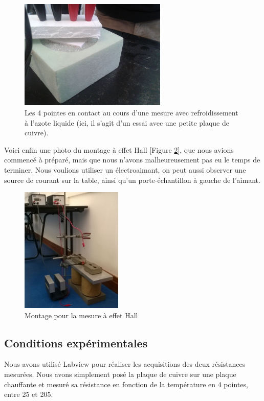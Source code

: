 \begin{figure}
  \begin{center}
		\includegraphics[width=7cm]{./images/photo5.jpg}
		\caption{Les 4 pointes en contact au cours d'une mesure avec refroidissement à l'azote liquide (ici, il s'agit d'un essai avec une petite plaque de cuivre).}
		\label{photo5}
	\end{center}
\end{figure}

Voici enfin une photo du montage à effet Hall [Figure \ref{photo_hall}], que nous avions commencé à préparé, 
mais que nous n'avons malheureusement pas eu le temps de terminer. Nous voulions utiliser un électroaimant, 
on peut aussi observer une source de courant sur la table, ainsi qu'un porte-échantillon à gauche de l'aimant.

\begin{figure}[!t]
  \begin{center}
		\includegraphics[height=6cm]{./images/photo_hall.jpg}
		\caption{Montage pour la mesure à effet Hall}
		\label{photo_hall}
	\end{center}
\end{figure}

\newpage

\subsection{Conditions expérimentales}
Nous avons utilisé Labview pour réaliser les acquisitions des deux résistances mesurées.
Nous avons simplement posé la plaque de cuivre sur une plaque chauffante et mesuré sa résistance en fonction de la température en 4 pointes, entre 25\celsius{} et 205\celsius{}.


